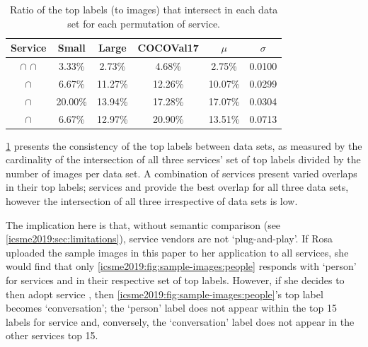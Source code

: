\begin{table}[t]
\caption[Ratio of consistent labels in computer vision services]{Ratio of the top labels (to images) that intersect in each data set for each permutation of service.}
\label{icsme2019:tab:intersect-of-labels}
\centering
\begin{tabular}{c||c|c|c||c|c}
  \toprule
  \textbf{Service} & \textbf{Small} & \textbf{Large} & \textbf{COCOVal17} & \textbf{$\mu$} & \textbf{$\sigma$} \\
  \midrule
  \googleapi{} $\cap$ \azureapi{} $\cap$ \awsapi{}  & 3.33\%   & 2.73\%   & 4.68\%   & 2.75\%  & 0.0100  \\
  \googleapi{} $\cap$ \azureapi{}                   & 6.67\%   & 11.27\%  & 12.26\%  & 10.07\% & 0.0299 \\
  \googleapi{} $\cap$ \awsapi{}                     & 20.00\%  & 13.94\%  & 17.28\%  & 17.07\% & 0.0304 \\
  \azureapi{} $\cap$ \awsapi{}                      & 6.67\%   & 12.97\%  & 20.90\%  & 13.51\% & 0.0713 \\
  \bottomrule
\end{tabular}
\end{table}

\cref{icsme2019:tab:intersect-of-labels} presents the consistency of the top labels between data sets, as measured by the cardinality of the intersection of all three services' set of top labels divided by the number of images per data set. A combination of services present varied overlaps in their top labels; services \googleapi{} and \awsapi{} provide the best overlap for all three data sets, however the intersection of all three irrespective of data sets is low.



The implication here is that, without semantic comparison (see \cref{icsme2019:sec:limitations}), service vendors are not `plug-and-play'. If Rosa uploaded the sample images in this paper to her application to all services, she would find that only \cref{icsme2019:fig:sample-images:people} responds with `person' for services  \azureapi{} and \awsapi{} in their respective set of top labels. However, if she decides to then adopt service \googleapi{}, then \cref{icsme2019:fig:sample-images:people}'s top label becomes `conversation'; the `person' label does not appear within the top 15 labels for service \googleapi{} and, conversely, the `conversation' label does not appear in the other services top 15. 

